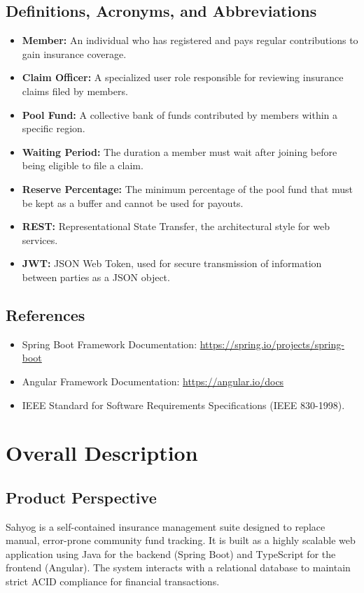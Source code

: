 \documentclass[12pt,a4paper]{article}
\begin{document}
\subsection{Definitions, Acronyms, and Abbreviations}
\begin{itemize}
    \item \textbf{Member:} An individual who has registered and pays regular contributions to gain insurance coverage.
    \item \textbf{Claim Officer:} A specialized user role responsible for reviewing insurance claims filed by members.
    \item \textbf{Pool Fund:} A collective bank of funds contributed by members within a specific region.
    \item \textbf{Waiting Period:} The duration a member must wait after joining before being eligible to file a claim.
    \item \textbf{Reserve Percentage:} The minimum percentage of the pool fund that must be kept as a buffer and cannot be used for payouts.
    \item \textbf{REST:} Representational State Transfer, the architectural style for web services.
    \item \textbf{JWT:} JSON Web Token, used for secure transmission of information between parties as a JSON object.
\end{itemize}

\subsection{References}
\begin{itemize}
    \item Spring Boot Framework Documentation: \url{https://spring.io/projects/spring-boot}
    \item Angular Framework Documentation: \url{https://angular.io/docs}
    \item IEEE Standard for Software Requirements Specifications (IEEE 830-1998).
\end{itemize}

\section{Overall Description}

\subsection{Product Perspective}
Sahyog is a self-contained insurance management suite designed to replace manual, error-prone community fund tracking. It is built as a highly scalable web application using Java for the backend (Spring Boot) and TypeScript for the frontend (Angular). The system interacts with a relational database to maintain strict ACID compliance for financial transactions.
\end{document}

